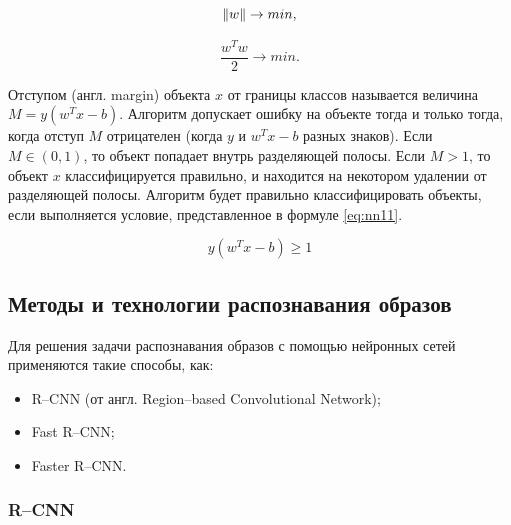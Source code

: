 \begin{equation}
	\label{eq:nn9}
	\Arrowvert w\Arrowvert \rightarrow min,
\end{equation}

\begin{equation}
	\label{eq:nn10}
	\frac{w^Tw}{2} \rightarrow min.
\end{equation}

Отступом (англ. margin) объекта $x$ от границы классов называется величина $M=y(w^Tx-b)$. Алгоритм допускает ошибку на объекте тогда и только тогда, когда отступ $M$ отрицателен (когда $y$ и $w^Tx-b$ разных знаков). Если $M ∈ (0, 1)$, то объект попадает внутрь разделяющей полосы. Если $M > 1$, то объект $x$ классифицируется правильно, и находится на некотором удалении от разделяющей полосы. Алгоритм будет правильно классифицировать объекты, если выполняется условие, представленное в формуле \ref{eq:nn11}.

\begin{equation}
	\label{eq:nn11}
	y(w^Tx-b) \geq 1
\end{equation}

\subsection{Методы и технологии распознавания образов}

Для решения задачи распознавания образов с помощью нейронных сетей применяются такие способы, как:
\begin{itemize}[leftmargin=1.6\parindent]
	\item R--CNN (от англ. Region--based Convolutional Network);
	\item Fast R--CNN;
	\item Faster R--CNN. 
\end{itemize}

\subsubsection{R--CNN}

